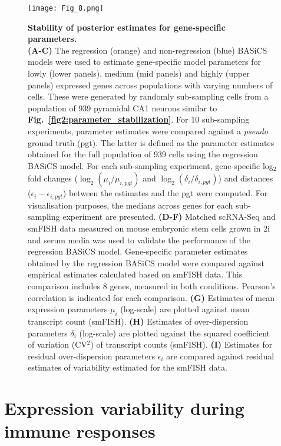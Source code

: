 \begin{figure}[!h]
\centering
\texttt{[image: Fig\_8.png]}
\caption[Stability of posterior estimates for gene-specific parameters]{\textbf{Stability of posterior estimates for gene-specific parameters.}\\
\textbf{(A-C)} The regression (orange) and non-regression (blue) BASiCS models were used to estimate gene-specific model parameters for lowly (lower panels), medium (mid panels) and highly (upper panels) expressed genes across populations with varying numbers of cells. These were generated by randomly sub-sampling cells from a population of 939 pyramidal CA1 neurons \citep{Zeisel2015} similar to \textbf{Fig.~\ref{fig2:parameter_stabilization}}. For 10 sub-sampling experiments, parameter estimates were compared against a \textit{pseudo} ground truth (pgt). The latter is defined as the parameter estimates obtained for the full population of 939 cells using the regression BASiCS model. For each sub-sampling experiment, gene-specific log$_2$ fold changes ($\log_2(\mu_i/\mu_{i,pgt})$ and $\log_2(\delta_i/\delta_{i,pgt})$) and distances ($\epsilon_i - \epsilon_{i,pgt}$) between the estimates and the pgt were computed. For visualisation purposes, the medians across genes for each sub-sampling experiment are presented. \textbf{(D-F)} Matched scRNA-Seq and smFISH data measured on mouse embryonic stem cells grown in 2i and serum media \citep{Grun2014} was used to validate the performance of the regression BASiCS model. Gene-specific parameter estimates obtained by the regression BASiCS model were compared against empirical estimates calculated based on smFISH data. This comparison includes 8 genes, measured in both conditions. Pearson's correlation is indicated for each comparison. \textbf{(G)} Estimates of mean expression parameters $\mu_i$ (log-scale) are plotted against mean transcript count (smFISH). \textbf{(H)} Estimates of over-dispersion parameters $\delta_i$ (log-scale) are plotted against the squared coefficient of variation (CV$^2$) of transcript counts (smFISH). \textbf{(I)} Estimates for residual over-dispersion parameters $\epsilon_i$ are compared against residual estimates of variability estimated for the smFISH data.}
\label{fig2:parameter_stabilization2}
\end{figure}

\newpage

\section{Expression variability during immune responses}

